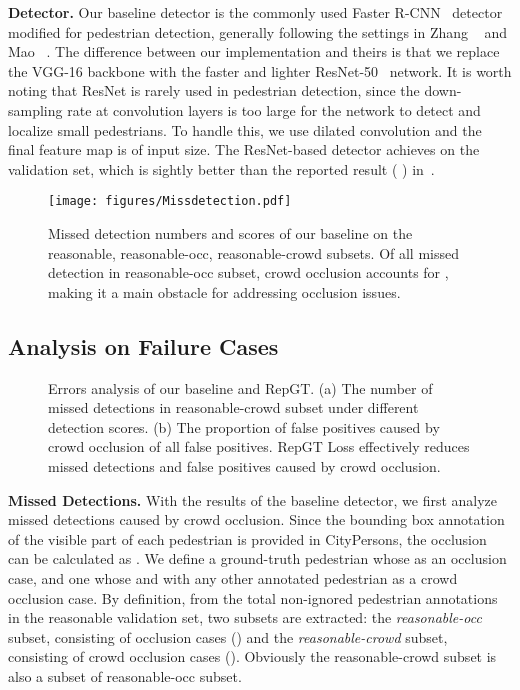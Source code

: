 \documentclass[10pt,twocolumn,letterpaper]{article}
\newcommand{\myparagraph}[1]{{\vspace{0.5em} \noindent \bf #1}}
\begin{document}
\myparagraph{Detector.}
Our baseline detector is the commonly used Faster R-CNN~\cite{NIPS2015_5638} detector modified for pedestrian detection, generally following the settings in Zhang \etal~\cite{zhang2016far} and Mao \etal~\cite{mao2017can}. The difference between our implementation and theirs is that we replace the VGG-16 backbone with the faster and lighter ResNet-50~\cite{he2016deep} network. It is worth noting that ResNet is rarely used in pedestrian detection, since the down-sampling rate at convolution layers is too large for the network to detect and localize small pedestrians. To handle this, we use dilated convolution and the final feature map is  of input size. The ResNet-based detector achieves   on the validation set, which is sightly better than the reported result ( ) in~\cite{zhang2017citypersons}.

\begin{figure}[t]
\texttt{[image: figures/Missdetection.pdf]}
\caption{Missed detection numbers and  scores of our baseline on the reasonable, reasonable-occ, reasonable-crowd subsets. Of all missed detection in reasonable-occ subset, crowd occlusion accounts for , making it a main obstacle for addressing occlusion issues.}
\label{fig:missdetection}
\end{figure}

\subsection{Analysis on Failure Cases}

\begin{figure}[!tbp]
\centering
{}
\caption{Errors analysis of our baseline and RepGT. (a) The number of missed detections in reasonable-crowd subset under different detection scores. (b) The proportion of false positives caused by crowd occlusion of all false positives. RepGT Loss effectively reduces missed detections and false positives caused by crowd occlusion.}
\vspace{-0.2cm}
\label{fig:crowderrors}
\end{figure}

\myparagraph{Missed Detections.}
With the results of the baseline detector, we first analyze missed detections caused by crowd occlusion. Since the bounding box annotation of the visible part of each pedestrian is provided in CityPersons, the occlusion can be calculated as . We define a ground-truth pedestrian whose  as an occlusion case, and one whose  and  with any other annotated pedestrian as a crowd occlusion case. By definition, from the total  non-ignored pedestrian annotations in the reasonable validation set, two subsets are extracted: the {\it reasonable-occ} subset, consisting of  occlusion cases () and the {\it reasonable-crowd} subset, consisting of  crowd occlusion cases (). Obviously the reasonable-crowd subset is also a subset of reasonable-occ subset.
\end{document}
